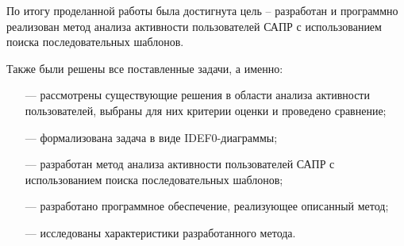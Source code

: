 По итогу проделанной работы была достигнута цель -- разработан и программно реализован метод анализа активности пользователей САПР с использованием поиска последовательных шаблонов.

Также были решены все поставленные задачи, а именно:

\begin{itemize}
	\item[---] рассмотрены существующие решения в области анализа активности пользователей, выбраны для них критерии оценки и проведено сравнение;
	\item[---] формализована задача в виде IDEF0-диаграммы;
	\item[---] разработан метод анализа активности пользователей САПР с использованием поиска последовательных шаблонов; %
	\item[---] разработано программное обеспечение, реализующее описанный метод;
	\item[---] исследованы характеристики разработанного метода.
\end{itemize}